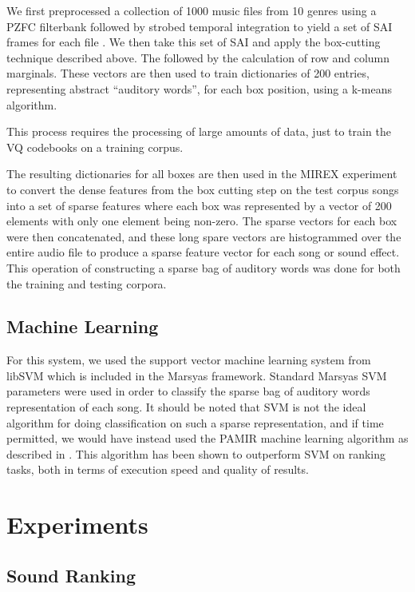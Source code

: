 We first preprocessed a collection of 1000 music files from 10 genres
using a PZFC filterbank followed by strobed temporal integration to
yield a set of SAI frames for each file .  We then take this set of
SAI and apply the box-cutting technique described above. The followed
by the calculation of row and column marginals.  These vectors are
then used to train dictionaries of 200 entries, representing abstract
``auditory words'', for each box position, using a k-means algorithm.

This process requires the processing of large amounts of data, just to
train the VQ codebooks on a training corpus.

The resulting dictionaries for all boxes are then used in the MIREX
experiment to convert the dense features from the box cutting step on
the test corpus songs into a set of sparse features where each box was
represented by a vector of 200 elements with only one element being
non-zero.  The sparse vectors for each box were then concatenated, and
these long spare vectors are histogrammed over the entire audio file
to produce a sparse feature vector for each song or sound effect.
This operation of constructing a sparse bag of auditory words was done
for both the training and testing corpora.

\subsection{Machine Learning}

For this system, we used the support vector machine learning system
from libSVM which is included in the Marsyas\cite{marsyas} framework.
Standard Marsyas SVM parameters were used in order to classify the
sparse bag of auditory words representation of each song.  It should
be noted that SVM is not the ideal algorithm for doing classification
on such a sparse representation, and if time permitted, we would have
instead used the PAMIR machine learning algorithm as described in
\cite{lyon10}.  This algorithm has been shown to outperform SVM on
ranking tasks, both in terms of execution speed and quality of
results.

\section{Experiments}


\subsection{Sound Ranking}

